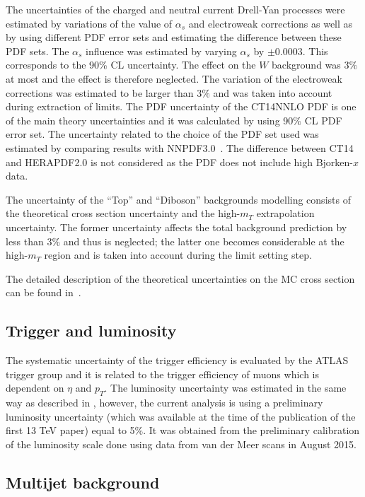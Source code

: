 The uncertainties of the charged and neutral current Drell-Yan processes were estimated by variations of the value of $\alpha_s$ and electroweak corrections as well as by using different PDF error sets and estimating the difference between these PDF sets.
The $\alpha_s$ influence was estimated by varying $\alpha_s$ by $\pm 0.0003$. This corresponds to the 90\% CL uncertainty. The effect on the $W$ background 
was $3\%$ at most and the effect is therefore neglected. 
The variation of the electroweak corrections was estimated to be larger than $3\%$ and was
taken into account during extraction of limits.
The PDF uncertainty of the CT14NNLO PDF is one of the main theory uncertainties
and it was calculated by using 90$\%$ CL PDF error set.
The uncertainty related to the choice of the PDF set used was estimated by comparing
results with NNPDF3.0~\cite{Ball:2014uwa}.
The difference between CT14 and HERAPDF2.0 is not considered as the PDF does not include high Bjorken-$x$ data. 

The uncertainty of the ``Top'' and ``Diboson'' backgrounds modelling consists of the theoretical cross section uncertainty and the high-$m_T$ extrapolation uncertainty. The former uncertainty affects the total background
prediction by less than 3$\%$ and thus is neglected; the latter one becomes considerable at the high-$m_T$ region and is taken into account during the limit setting step.

The detailed description of the theoretical uncertainties on the MC cross section can be found in~\cite{Aaboud:2016zkn}.

\subsection{Trigger and luminosity}
The systematic uncertainty of the trigger efficiency is evaluated by the ATLAS trigger group and it is related to the trigger
efficiency of muons which is dependent on $\eta$ and $p_T$.
The luminosity uncertainty was estimated in the same way as described in , however, the current analysis is using a preliminary luminosity
uncertainty (which was available at the time of the publication of the first 13 TeV paper) equal to 5$\%$. It was obtained from the preliminary calibration of the luminosity scale done using data from van der Meer scans in August 2015.

\subsection{Multijet background}
\label{subsec:multijet_systematcs}

